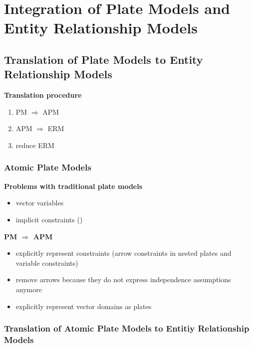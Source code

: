 \section{Integration of Plate Models and Entity Relationship Models}

\subsection{Translation of Plate Models to Entity Relationship Models}

\textbf{Translation procedure}
\begin{enumerate}
\item PM $\Rightarrow$ APM
\item APM $\Rightarrow$ ERM
\item reduce ERM
\end{enumerate}

\subsubsection{Atomic Plate Models}

\textbf{Problems with traditional plate models}
\begin{itemize}
\item vector variables
\item implicit constraints (\cite{heckerman2007probabilistic})
\end{itemize}

\textbf{PM $\Rightarrow$ APM}
\begin{itemize}
\item explicitly represent constraints (arrow constraints in nested plates and variable constraints)
\item remove arrows because they do not express independence assumptions anymore
\item explicitly represent vector domains as plates
\end{itemize}

\subsubsection{Translation of Atomic Plate Models to Entitiy Relationship Models}


